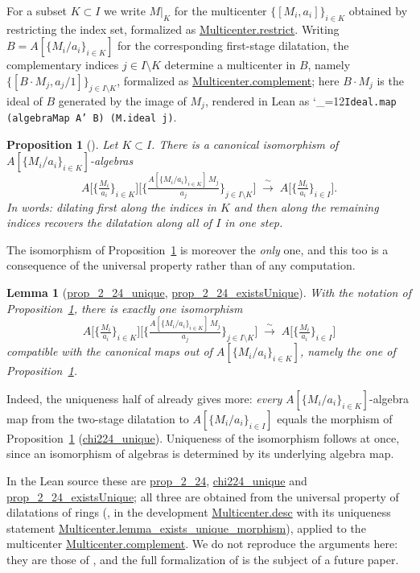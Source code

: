 \documentclass[11pt]{amsart}
\newcommand{\lc}[1]{\url{#1}}
\newcommand{\lcode}{\begingroup\catcode`\_=12\relax\lcodeInner}
\newcommand{\lcodeInner}[1]{\texttt{#1}\endgroup}
\theoremstyle{plain}
\newtheorem{proposition}[theorem]{Proposition}
\newtheorem{lemma}[theorem]{Lemma}
\theoremstyle{definition}
\theoremstyle{remark}
\begin{document}
For a subset $K \subset I$ we write $M|_K$ for the multicenter $\{[M_i,a_i]\}_{i\in K}$
obtained by restricting the index set, formalized as \lc{Multicenter.restrict}. Writing
$B = A[\{M_i/a_i\}_{i\in K}]$ for the corresponding first-stage dilatation, the
complementary indices $j \in I \setminus K$ determine a multicenter in $B$, namely
$\{[B\cdot M_j, a_j/1]\}_{j \in I \setminus K}$, formalized as
\lc{Multicenter.complement}; here $B \cdot M_j$ is the ideal of $B$ generated by the image
of $M_j$, rendered in Lean as \lcode{Ideal.map (algebraMap A' B) (M.ideal j)}.

\begin{proposition}[{\citep[Proposition~2.24]{M}}]
\label{prop:app-2-24}
Let $K \subset I$. There is a canonical isomorphism of $A[\{M_i/a_i\}_{i\in K}]$-algebras
\[
  A\Big[\big\{\tfrac{M_i}{a_i}\big\}_{i\in K}\Big]
    \Big[\Big\{\tfrac{A[\{M_i/a_i\}_{i\in K}]\,M_j}{a_j}\Big\}_{j \in I\setminus K}\Big]
  \;\xrightarrow{\ \sim\ }\;
  A\Big[\big\{\tfrac{M_i}{a_i}\big\}_{i\in I}\Big].
\]
In words: dilating first along the indices in $K$ and then along the remaining indices
recovers the dilatation along all of $I$ in one step.
\end{proposition}

The isomorphism of Proposition~\ref{prop:app-2-24} is moreover the \emph{only} one, and this
too is a consequence of the universal property rather than of any computation.

\begin{lemma}[\lc{prop_2_24_unique}, \lc{prop_2_24_existsUnique}]
\label{lem:app-2-24-unique}
With the notation of Proposition~\ref{prop:app-2-24}, there is exactly one isomorphism
\[
  A\Big[\big\{\tfrac{M_i}{a_i}\big\}_{i\in K}\Big]
    \Big[\Big\{\tfrac{A[\{M_i/a_i\}_{i\in K}]\,M_j}{a_j}\Big\}_{j \in I\setminus K}\Big]
  \;\xrightarrow{\ \sim\ }\;
  A\Big[\big\{\tfrac{M_i}{a_i}\big\}_{i\in I}\Big]
\]
compatible with the canonical maps out of $A[\{M_i/a_i\}_{i\in K}]$, namely the one of
Proposition~\ref{prop:app-2-24}.
\end{lemma}

Indeed, the uniqueness half of \citep[Proposition~2.29]{M} already gives more: \emph{every}
$A[\{M_i/a_i\}_{i\in K}]$-algebra map from the two-stage dilatation to
$A[\{M_i/a_i\}_{i\in I}]$ equals the morphism of Proposition~\ref{prop:app-2-24}
(\lc{chi224_unique}).
Uniqueness of the isomorphism follows at once, since an isomorphism of algebras is determined
by its underlying algebra map.

In the Lean source these are \lc{prop_2_24}, \lc{chi224_unique} and
\lc{prop_2_24_existsUnique}; all three are obtained from the universal property of dilatations of
rings (\citep[Proposition~2.29]{M}, in the development \lc{Multicenter.desc} with its
uniqueness statement \lc{Multicenter.lemma_exists_unique_morphism}), applied to the
multicenter \lc{Multicenter.complement}. We do not reproduce the arguments here: they are
those of \citep[\S 2.2]{M}, and the full formalization of \citep{M} is the subject of a
future paper.
\end{document}
